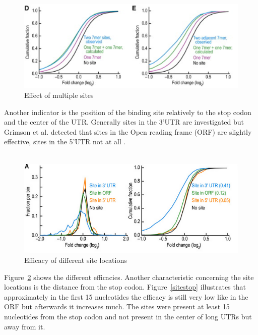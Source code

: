 \documentclass[12pt]{article}
\begin{document}
\begin{figure}[h]
\centering
\includegraphics[scale=0.7]{results/sites_distance.PNG}
\caption{Effect of multiple sites}
\label{sitedistance}
\end{figure}

Another indicator is the position of the binding site relatively to the stop codon and the center of the UTR. Generally sites in the 3'UTR are investigated but Grimson et al. detected that sites in the Open reading frame (ORF) are slightly effective, sites in the 5'UTR not at all \cite{Grimson}. \\\\

\begin{figure}[h]
\centering
\includegraphics[scale=0.6]{results/sites_orf.PNG}
\caption{Efficacy of different site locations}
\label{siteorf}
\end{figure}

Figure~\ref{siteorf} shows the different efficacies. Another characteristic concerning the site locations is the distance from the stop codon. Figure~\ref{sitestop} illustrates that approximately in the first 15 nucleotides the efficacy is still very low like in the ORF but afterwards it increases much. 
The sites were present at least 15 nucleotides from the stop codon and not present in the center of long UTRs but away from it. \\\\
\end{document}
